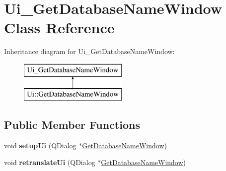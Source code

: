 \hypertarget{class_ui___get_database_name_window}{}\section{Ui\+\_\+\+Get\+Database\+Name\+Window Class Reference}
\label{class_ui___get_database_name_window}
Inheritance diagram for Ui\+\_\+\+Get\+Database\+Name\+Window\+:\begin{figure}[H]
\begin{center}
\leavevmode
\includegraphics[height=2.000000cm]{class_ui___get_database_name_window}
\end{center}
\end{figure}
\subsection*{Public Member Functions}
\begin{DoxyCompactItemize}
\item 
\mbox{\label{class_ui___get_database_name_window_abe670cb0626bd8c2db5f586b00297dd2}} 
void {\bfseries setup\+Ui} (Q\+Dialog $\ast$\mbox{\hyperlink{class_get_database_name_window}{Get\+Database\+Name\+Window}})
\item 
\mbox{\label{class_ui___get_database_name_window_ab7805601725849c954765cb3d0622f6d}} 
void {\bfseries retranslate\+Ui} (Q\+Dialog $\ast$\mbox{\hyperlink{class_get_database_name_window}{Get\+Database\+Name\+Window}})
\end{DoxyCompactItemize}

